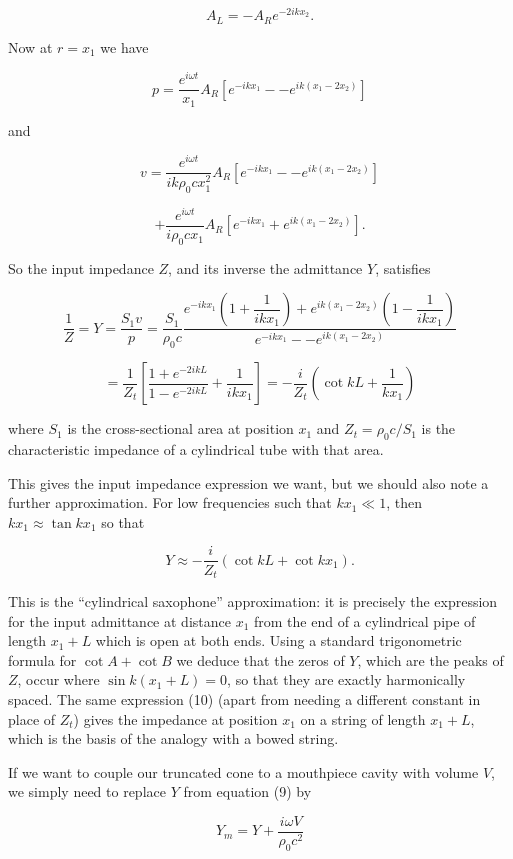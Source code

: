   $$A_L=-A_R e^{-2ikx_2} . \tag{6}$$ 

  Now at $r=x_1$ we have 

  $$p=\dfrac{e^{i \omega t}}{x_1} A_R \left[ e^{-ikx_1} -- e^{ik(x_1-2x_2)} 
  \right] \tag{7}$$ 

  and 

  $$v= \dfrac{e^{i \omega t}}{ik\rho_0 c x_1^2} A_R \left[ e^{-ikx_1} -- 
  e^{ik(x_1-2x_2)} \right] $$ 

  $$+ \dfrac{e^{i \omega t}}{i\rho_0 c x_1} A_R \left[ e^{-ikx_1}+ 
  e^{ik(x_1-2x_2)} \right] . \tag{8}$$ 

  So the input impedance $Z$, and its inverse the admittance $Y$, satisfies 

  $$\dfrac{1}{Z}=Y=\dfrac{S_1v}{p}=\dfrac{S_1}{\rho_0 c} \dfrac{e^{-ikx_1} 
  \left(1+\dfrac{1}{ikx_1}\right) + e^{ik(x_1-2x_2)} \left(1-\dfrac{1}{ikx_1} 
  \right)}{e^{-ikx_1} -- e^{ik(x_1-2x_2)}}$$ 

  $$=\dfrac{1}{Z_t}\left[ \dfrac{1+e^{-2ikL}}{1-e^{-2ikL}}+ 
  \dfrac{1}{ikx_1}\right]=-\dfrac{i}{Z_t}\left(\cot kL + \dfrac{1}{kx_1} 
  \right) \tag{9}$$ 

  where $S_1$ is the cross-sectional area at position $x_1$ and $Z_t=\rho_0 
  c/S_1$ is the characteristic impedance of a cylindrical tube with that area. 

  This gives the input impedance expression we want, but we should also note a 
  further approximation. For low frequencies such that $kx_1 \ll 1$, then $kx_1 
  \approx \tan kx_1$ so that 

  $$Y \approx -\dfrac{i}{Z_t}\left(\cot kL + \cot kx_1 \right) . \tag{10}$$ 

  This is the ``cylindrical saxophone'' approximation: it is precisely the 
  expression for the input admittance at distance $x_1$ from the end of a 
  cylindrical pipe of length $x_1+L$ which is open at both ends. Using a 
  standard trigonometric formula for $\cot A + \cot B$ we deduce that the zeros 
  of $Y$, which are the peaks of $Z$, occur where $\sin k(x_1+L)=0$, so that 
  they are exactly harmonically spaced. The same expression (10) (apart from 
  needing a different constant in place of $Z_t$) gives the impedance at 
  position $x_1$ on a string of length $x_1+L$, which is the basis of the 
  analogy with a bowed string. 

  If we want to couple our truncated cone to a mouthpiece cavity with volume 
  $V$, we simply need to replace $Y$ from equation (9) by 

  $$Y_m=Y+\dfrac{i \omega V}{\rho_0 c^2} \tag{11}$$ 

